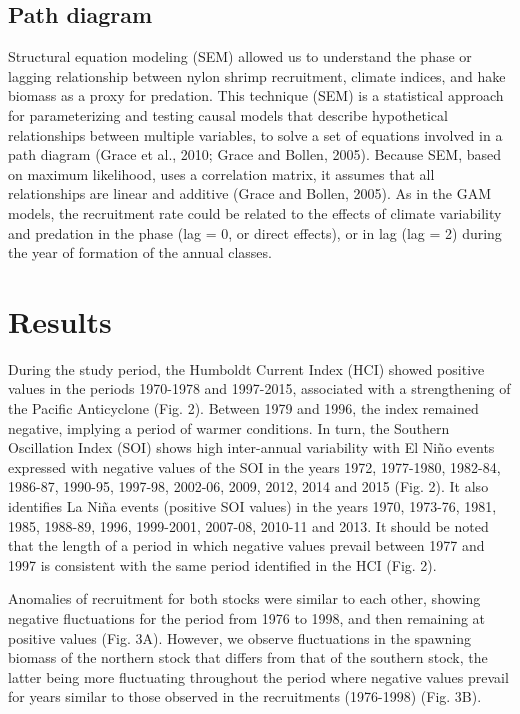 \documentclass[12pt]{article}
\begin{document}
\hypertarget{path-diagram}{%
\subsection{Path diagram}\label{path-diagram}}

Structural equation modeling (SEM) allowed us to understand the phase or
lagging relationship between nylon shrimp recruitment, climate indices,
and hake biomass as a proxy for predation. This technique (SEM) is a
statistical approach for parameterizing and testing causal models that
describe hypothetical relationships between multiple variables, to solve
a set of equations involved in a path diagram (Grace et al., 2010; Grace
and Bollen, 2005). Because SEM, based on maximum likelihood, uses a
correlation matrix, it assumes that all relationships are linear and
additive (Grace and Bollen, 2005). As in the GAM models, the recruitment
rate could be related to the effects of climate variability and
predation in the phase (lag = 0, or direct effects), or in lag (lag = 2)
during the year of formation of the annual classes.

\FloatBarrier

\hypertarget{results}{%
\section{Results}\label{results}}

During the study period, the Humboldt Current Index (HCI) showed
positive values in the periods 1970-1978 and 1997-2015, associated with
a strengthening of the Pacific Anticyclone (Fig. 2). Between 1979 and
1996, the index remained negative, implying a period of warmer
conditions. In turn, the Southern Oscillation Index (SOI) shows high
inter-annual variability with El Niño events expressed with negative
values of the SOI in the years 1972, 1977-1980, 1982-84, 1986-87,
1990-95, 1997-98, 2002-06, 2009, 2012, 2014 and 2015 (Fig. 2). It also
identifies La Niña events (positive SOI values) in the years 1970,
1973-76, 1981, 1985, 1988-89, 1996, 1999-2001, 2007-08, 2010-11 and
2013. It should be noted that the length of a period in which negative
values prevail between 1977 and 1997 is consistent with the same period
identified in the HCI (Fig. 2).

Anomalies of recruitment for both stocks were similar to each other,
showing negative fluctuations for the period from 1976 to 1998, and then
remaining at positive values (Fig. 3A). However, we observe fluctuations
in the spawning biomass of the northern stock that differs from that of
the southern stock, the latter being more fluctuating throughout the
period where negative values prevail for years similar to those observed
in the recruitments (1976-1998) (Fig. 3B).
\end{document}

